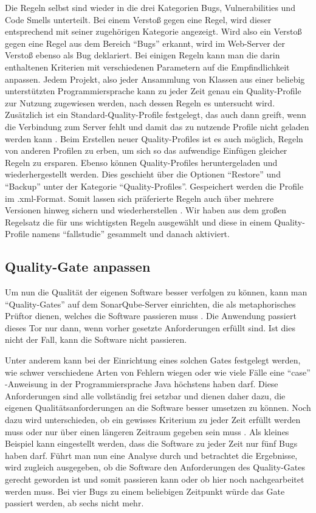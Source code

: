 Die Regeln selbst sind wieder in die drei Kategorien Bugs, Vulnerabilities und Code Smells unterteilt. Bei einem Verstoß gegen eine Regel, wird dieser entsprechend mit seiner zugehörigen Kategorie angezeigt. Wird also ein Verstoß gegen eine Regel aus dem Bereich \enquote{Bugs} erkannt, wird im Web-Server der Verstoß ebenso als Bug deklariert. Bei einigen Regeln kann man die darin enthaltenen Kriterien mit verschiedenen Parametern auf die Empfindlichkeit anpassen.
Jedem Projekt, also jeder Ansammlung von Klassen aus einer beliebig unterstützten Programmiersprache kann zu jeder Zeit genau ein Quality-Profile zur Nutzung zugewiesen werden, nach dessen Regeln es untersucht wird. Zusätzlich ist ein Standard-Quality-Profile festgelegt, das auch dann greift, wenn die Verbindung zum Server fehlt und damit das zu nutzende Profile nicht geladen werden kann \autocite[Vgl.][]{QualityProfile}. Beim Erstellen neuer Quality-Profiles ist es auch möglich, Regeln von anderen Profilen zu erben, um sich so das aufwendige Einfügen gleicher Regeln zu ersparen. Ebenso können Quality-Profiles heruntergeladen und wiederhergestellt werden. Dies geschieht über die Optionen \enquote{Restore} und \enquote{Backup} unter der Kategorie \enquote{Quality-Profiles}. Gespeichert werden die Profile im .xml-Format. Somit lassen sich präferierte Regeln auch über mehrere Versionen hinweg sichern und wiederherstellen \autocite[Vgl.][]{QualityProfile}.
Wir haben aus dem großen Regelsatz die für uns wichtigsten Regeln ausgewählt und diese in einem Quality-Profile namens \enquote{fallstudie} gesammelt und danach aktiviert.

\subsection{Quality-Gate anpassen}

Um nun die Qualität der eigenen Software besser verfolgen zu können, kann man \enquote{Quality-Gates} auf dem SonarQube-Server einrichten, die als metaphorisches Prüftor dienen, welches die Software passieren muss \autocite[Vgl.][]{QualityGate}. Die Anwendung passiert dieses Tor nur dann, wenn vorher gesetzte Anforderungen erfüllt sind. Ist dies nicht der Fall, kann die Software nicht passieren.

Unter anderem kann bei der Einrichtung eines solchen Gates festgelegt werden, wie schwer verschiedene Arten von Fehlern wiegen oder wie viele Fälle eine \enquote{case} -Anweisung in der Programmiersprache Java höchstens haben darf. Diese Anforderungen sind alle vollständig frei setzbar und dienen daher dazu, die eigenen Qualitätsanforderungen an die Software besser umsetzen zu können. Noch dazu wird unterschieden, ob ein gewisses Kriterium zu jeder Zeit erfüllt werden muss oder nur über einen längeren Zeitraum gegeben sein muss \autocite[Vgl.][]{QualityGate}. 
Als kleines Beispiel kann eingestellt werden, dass die Software zu jeder Zeit nur fünf Bugs haben darf. Führt man nun eine Analyse durch und betrachtet die Ergebnisse, wird zugleich ausgegeben, ob die Software den Anforderungen des Quality-Gates gerecht geworden ist und somit passieren kann oder ob hier noch nachgearbeitet werden muss. Bei vier Bugs zu einem beliebigen Zeitpunkt würde das Gate passiert werden, ab sechs nicht mehr.

